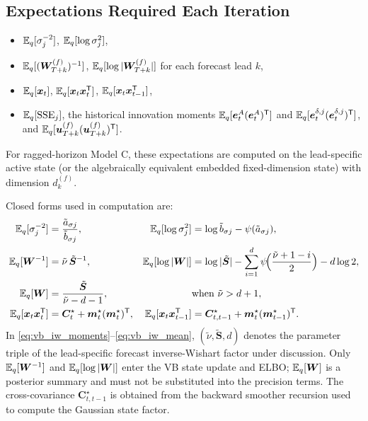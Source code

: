 \subsection{Expectations Required Each Iteration}
\begin{itemize}
\item $\mathbb{E}_q[\sigma_j^{-2}]$, $\mathbb{E}_q[\log\sigma_j^2]$,
\item $\mathbb{E}_q[(\bm W_{T+k}^{(f)})^{-1}]$, $\mathbb{E}_q[\log|\bm W_{T+k}^{(f)}|]$ for each forecast lead $k$,
\item $\mathbb{E}_q[\bm x_t]$, $\mathbb{E}_q[\bm x_t\bm x_t^{\mathsf{T}}]$, $\mathbb{E}_q[\bm x_t\bm x_{t-1}^{\mathsf{T}}]$,
\item $\mathbb{E}_q[\mathrm{SSE}_j]$, the historical innovation moments
      $\mathbb{E}_q[\bm e_t^A(\bm e_t^A)^{\mathsf{T}}]$ and $\mathbb{E}_q[\bm e_t^{\delta,j}(\bm e_t^{\delta,j})^{\mathsf{T}}]$, and
      $\mathbb{E}_q[\bm u_{T+k}^{(f)}(\bm u_{T+k}^{(f)})^{\mathsf{T}}]$.
\end{itemize}
For ragged-horizon Model C, these expectations are computed on the lead-specific active
state (or the algebraically equivalent embedded fixed-dimension state) with dimension $d_k^{(f)}$.

Closed forms used in computation are:
\begin{align}
\mathbb{E}_q[\sigma_j^{-2}] &= \frac{\tilde a_{\sigma j}}{\tilde b_{\sigma j}},
& \mathbb{E}_q[\log \sigma_j^2] &= \log \tilde b_{\sigma j}-\psi(\tilde a_{\sigma j}), \label{eq:vb_sigma_moments}\\
\mathbb{E}_q[\bm W^{-1}] &= \tilde\nu\,\tilde{\bm S}^{-1},
& \mathbb{E}_q[\log|\bm W|] &= \log|\tilde{\bm S}|-\sum_{i=1}^{d}\psi\!\Big(\frac{\tilde\nu+1-i}{2}\Big)-d\log 2, \label{eq:vb_iw_moments}\\
\mathbb{E}_q[\bm W] &= \frac{\tilde{\bm S}}{\tilde\nu-d-1},
& &\text{when }\tilde\nu>d+1, \label{eq:vb_iw_mean}\\
\mathbb{E}_q[\bm x_t\bm x_t^{\mathsf{T}}] &= \bm C_t^\star+\bm m_t^\star(\bm m_t^\star)^{\mathsf{T}},
& \mathbb{E}_q[\bm x_t\bm x_{t-1}^{\mathsf{T}}] &= \bm C_{t,t-1}^\star+\bm m_t^\star(\bm m_{t-1}^\star)^{\mathsf{T}}. \label{eq:vb_state_moments}
\end{align}
In \eqref{eq:vb_iw_moments}--\eqref{eq:vb_iw_mean}, $(\tilde\nu,\tilde{\bm S},d)$ denotes the
parameter triple of the lead-specific forecast inverse-Wishart factor under discussion.
Only $\mathbb{E}_q[\bm W^{-1}]$ and $\mathbb{E}_q[\log|\bm W|]$ enter the VB state update and ELBO;
$\mathbb{E}_q[\bm W]$ is a posterior summary and must not be substituted into the precision terms.
The cross-covariance $\bm C_{t,t-1}^\star$ is obtained from the backward smoother recursion
used to compute the Gaussian state factor.
